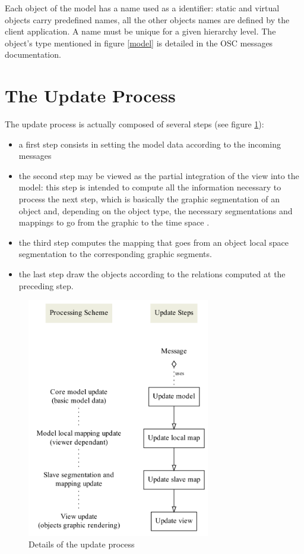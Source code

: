 \documentclass[a4paper]{article}
\begin{document}
Each object of the model has a name used as a identifier: static and virtual objects carry predefined names, all the other objects names are defined by the client application. A name must be unique for a given hierarchy level.
The object's type mentioned in figure \ref{model} is detailed in the OSC messages documentation.

\section{The Update Process}

The update process is actually composed of several steps (see figure \ref{update}):
\begin{itemize}
\item a first step consists in setting the model data according to the incoming messages
\item the second step may be viewed as the partial integration of the view into the model: this step is intended to compute all the information necessary to process the next step, which is basically the graphic segmentation of an object and, depending on the object type, the necessary segmentations and mappings to go from the graphic to the time space \cite{fober10a}.
\item the third step computes the mapping that goes from an object local space segmentation to the corresponding graphic segments.
\item the last step draw the objects according to the relations computed at the preceding step.
\end{itemize}

\begin{figure}[h]
	\centering \includegraphics[width=80mm]{rsrc/update}
 \caption{Details of the update process}
 \label{update}
\end{figure}
\end{document}
